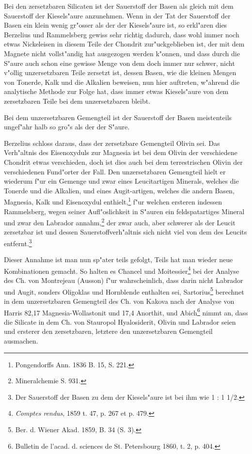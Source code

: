 \documentclass[a4paper, 11pt, oneside, german]{article}
\begin{document}
Bei den zersetzbaren Silicaten ist der Sauerstoff der Basen als gleich mit dem Sauerstoff der Kiesels"aure anzunehmen. Wenn in der Tat der Sauerstoff der Basen ein klein wenig gr"osser als der der Kiesels"aure ist, so erkl"aren dies Berzelius und Rammelsberg gewiss sehr richtig dadurch, dass wohl immer noch etwas Nickeleisen in diesem Teile der Chondrit zur"uckgeblieben ist, der mit dem Magnete nicht vollst"andig hat ausgezogen werden k"onnen, und dass durch die S"aure auch schon eine gewisse Menge von dem doch immer nur schwer, nicht v"ollig unzersetzbaren Teile zersetzt ist, dessen Basen, wie die kleinen Mengen von Tonerde, Kalk und die Alkalien beweisen, nun hier auftreten, w"ahrend die analytische Methode zur Folge hat, dass immer etwas Kiesels"aure von dem zersetzbaren Teile bei dem unzersetzbaren bleibt.

Bei dem unzersetzbaren Gemengteil ist der Sauerstoff der Basen meistenteils ungef"ahr halb so gro"s als der der S"aure.

Berzelius schloss daraus, dass der zersetzbare Gemengteil Olivin sei. Das Verh"altnis des Eisenoxyduls zur Magnesia ist bei dem Olivin der verschiedene Chondrit etwas verschieden, doch ist dies auch bei dem terrestrischen Olivin der verschiedenen Fund"orter der Fall. Den unzersetzbaren Gemengteil hielt er wiederum f"ur ein Gemenge und zwar eines Leucitartigen Minerals, welches die Tonerde und die Alkalien, und eines Augit-artigen, welches die andern Basen, Magnesia, Kalk und Eisenoxydul enthielt,\footnote{Pongendorffs Ann. 1836 B. 15, S. 221.} f"ur welchen ersteren indessen Rammelsberg, wegen seiner Aufl"oslichkeit in S"auren ein feldspatartiges Mineral und zwar den Labrador annahm,\footnote{Mineralchemie S. 931.} der zwar auch, aber schwerer als der Leucit zersetzbar ist und dessen Sauerstoffverh"altnis sich nicht viel von dem des Leucits entfernt.\footnote{Der Sauerstoff der Basen zu dem der Kiesels"aure ist bei ihm wie 1 : 1 1/2.}

Dieser Annahme ist man nun sp"ater teils gefolgt, Teils hat man wieder neue Kombinationen gemacht. So halten es Chancel und Moitessier\footnote{\emph{Comptes rendus}, 1859 t. 47, p. 267 et p. 479.} bei der Analyse des Ch. von Montrejeau (Ausson) f"ur wahrscheinlich, dass darin nicht Labrador und Augit, sonders Oligoklas und Hornblende enthalten sei, Sartorius\footnote{Ber. d. Wiener Akad. 1859, B. 34 (S. 3).} berechnet in dem unzersetzbaren Gemengteil des Ch. von Kakova nach der Analyse von Harris 82,17 Magnesia-Wollastonit und 17,4 Anorthit, und Abich\footnote{Bulletin de l'acad. d. sciences de St. Petersbourg 1860, t. 2, p. 404.} nimmt an, dass die Silicate in dem Ch. von Stauropol Hyalosiderit, Olivin und Labrador seien und ersterer den zersetzbaren, letztere den unzersetzbaren Gemengteil ausmachen.
\end{document}

